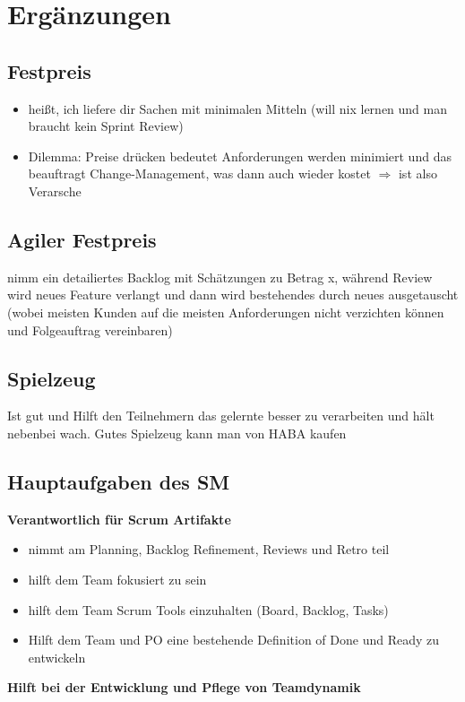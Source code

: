 \section{Ergänzungen}
\subsection{Festpreis}
\begin{itemize}
  \item heißt, ich liefere dir Sachen mit minimalen Mitteln (will nix lernen und man braucht kein Sprint Review)
  \item Dilemma: Preise drücken bedeutet Anforderungen werden minimiert und das beauftragt
    Change-Management, was dann auch wieder kostet $\Rightarrow$ ist also Verarsche
\end{itemize}


\subsection{Agiler Festpreis}
nimm ein detailiertes Backlog mit Schätzungen zu Betrag x, während Review wird neues Feature
verlangt und dann wird bestehendes durch neues ausgetauscht (wobei meisten Kunden auf die
meisten Anforderungen nicht verzichten können und Folgeauftrag vereinbaren)


\subsection{Spielzeug}
Ist gut und Hilft den Teilnehmern das gelernte besser zu verarbeiten und hält nebenbei wach.
Gutes Spielzeug kann man von HABA kaufen


\subsection{Hauptaufgaben des SM}

\textbf{Verantwortlich für Scrum Artifakte}
\begin{itemize}
  \item nimmt am Planning, Backlog Refinement, Reviews und Retro teil
  \item hilft dem Team fokusiert zu sein
  \item hilft dem Team Scrum Tools einzuhalten (Board, Backlog, Tasks)
  \item Hilft dem Team und PO eine bestehende Definition of Done und Ready zu entwickeln
\end{itemize}


\textbf{Hilft bei der Entwicklung und Pflege von Teamdynamik}

